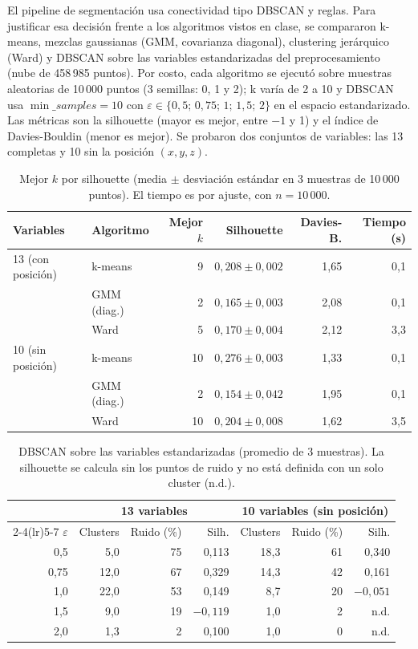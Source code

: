 \documentclass[11pt,a4paper]{article}
\begin{document}
El pipeline de segmentación usa conectividad tipo DBSCAN y reglas. Para justificar esa decisión frente a los algoritmos vistos en clase, se compararon k-means, mezclas gaussianas (GMM, covarianza diagonal), clustering jerárquico (Ward) y DBSCAN sobre las variables estandarizadas del preprocesamiento (nube de 458\,985 puntos). Por costo, cada algoritmo se ejecutó sobre muestras aleatorias de 10\,000 puntos (3 semillas: 0, 1 y 2); k varía de 2 a 10 y DBSCAN usa $\min\text{\_}samples=10$ con $\varepsilon\in\{0{,}5;\,0{,}75;\,1;\,1{,}5;\,2\}$ en el espacio estandarizado. Las métricas son la silhouette (mayor es mejor, entre $-1$ y 1) y el índice de Davies-Bouldin (menor es mejor). Se probaron dos conjuntos de variables: las 13 completas y 10 sin la posición $(x,y,z)$.

\begin{table}[H]
\centering
\small
\begin{tabular}{llrrrr}
\toprule
Variables & Algoritmo & Mejor $k$ & Silhouette & Davies-B. & Tiempo (s) \\
\midrule
13 (con posición) & k-means & 9 & $0{,}208\pm0{,}002$ & 1,65 & 0,1 \\
 & GMM (diag.) & 2 & $0{,}165\pm0{,}003$ & 2,08 & 0,1 \\
 & Ward & 5 & $0{,}170\pm0{,}004$ & 2,12 & 3,3 \\
\midrule
10 (sin posición) & k-means & 10 & $0{,}276\pm0{,}003$ & 1,33 & 0,1 \\
 & GMM (diag.) & 2 & $0{,}154\pm0{,}042$ & 1,95 & 0,1 \\
 & Ward & 10 & $0{,}204\pm0{,}008$ & 1,62 & 3,5 \\
\bottomrule
\end{tabular}
\caption{Mejor $k$ por silhouette (media $\pm$ desviación estándar en 3 muestras de 10\,000 puntos). El tiempo es por ajuste, con $n=10\,000$.}
\end{table}

\begin{table}[H]
\centering
\small
\begin{tabular}{rrrrrrr}
\toprule
& \multicolumn{3}{c}{13 variables} & \multicolumn{3}{c}{10 variables (sin posición)} \\
\cmidrule(lr){2-4}\cmidrule(lr){5-7}
$\varepsilon$ & Clusters & Ruido (\%) & Silh. & Clusters & Ruido (\%) & Silh. \\
\midrule
0,5 & 5,0 & 75 & 0,113 & 18,3 & 61 & 0,340 \\
0,75 & 12,0 & 67 & 0,329 & 14,3 & 42 & 0,161 \\
1,0 & 22,0 & 53 & 0,149 & 8,7 & 20 & $-0{,}051$ \\
1,5 & 9,0 & 19 & $-0{,}119$ & 1,0 & 2 & n.d. \\
2,0 & 1,3 & 2 & 0,100 & 1,0 & 0 & n.d. \\
\bottomrule
\end{tabular}
\caption{DBSCAN sobre las variables estandarizadas (promedio de 3 muestras). La silhouette se calcula sin los puntos de ruido y no está definida con un solo cluster (n.d.).}
\end{table}
\end{document}
